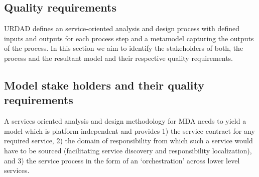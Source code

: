 \subsection{Quality requirements}


URDAD defines an service-oriented analysis and design process with defined inputs and outputs for each process step and a metamodel capturing the outputs of the process. In this section we aim to identify the stakeholders of both, the process and the resultant model and their respective quality requirements.

\subsection{Model stake holders and their quality requirements}

A services oriented analysis and design methodology for MDA needs to yield a model which is platform independent and provides 1) the service contract for any required service, 2) the domain of responsibility from which such a service would have to be sourced (facilitating service discovery and responsibility localization), and 3) the service process in the form of an `orchestration' across lower level services\cite{}.

